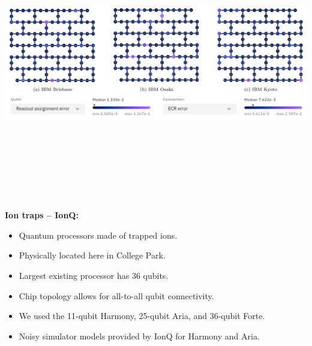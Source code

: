 \documentclass[portrait,a0b,final]{a0poster}
\newenvironment{poster}{
  \begin{center}
  \begin{minipage}[c]{0.98\textwidth}
}{
  \end{minipage} 
  \end{center}
}
\newenvironment{pcolumn}[1]{
  \begin{minipage}{#1\textwidth}
  \begin{center}
}{
  \end{center}
  \end{minipage}
}
\begin{document}
\begin{poster}
\begin{center}
\begin{pcolumn}{0.495}
{\begin{center}
  \includegraphics[height=12cm,angle=0]{ibmDevices.png}
\end{center}

\textbf{Ion traps -- IonQ:}
\begin{itemize}
  \item Quantum processors made of trapped ions.
  \item Physically located here in College Park.
  \item Largest existing processor has 36 qubits.
  \item Chip topology allows for all-to-all qubit connectivity.
  \item We used the 11-qubit Harmony, 25-qubit Aria, and 36-qubit Forte.
  \item Noisy simulator models provided by IonQ for Harmony and Aria.
\end{itemize}

}
\end{pcolumn}
\end{center}
\end{poster}
\end{document}
